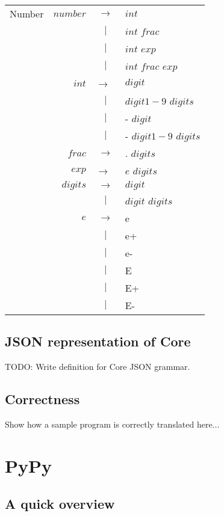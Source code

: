 \documentclass{article}
\begin{document}
\begin{small}
\begin{longtable}{ l r c l }
Number		&
$number$	& $ \rightarrow $ 	& $int$ 			\\
		&
		& $ | $			& $int$ $frac$			\\
		&
		& $ | $			& $int$ $exp$			\\
		&
		& $ | $			& $int$ $frac$ $exp$		\\
		&
$int$		& $ \rightarrow$ 	& $digit$			\\
		&
		& $ | $ 		& $digit1-9$ $digits$		\\
		&
		& $ | $ 		& - $digit$			\\
		&
		& $ | $ 		& - $digit1-9$ $digits$	\\
		&
$frac$ 		& $ \rightarrow $ 	& . $digits$ 		\\
		&
$exp$		& $ \rightarrow $ 	& $e$ $digits$ 			\\
		&
$digits$	& $ \rightarrow $ 	& $digit$			\\
		&
		& $ | $ 		& $digit$ $digits$		\\
		&
$e$		& $ \rightarrow $ 	& e				\\
		&
		& $ | $ 		& e+				\\
		&
		& $ | $ 		& e- 				\\
		&
		& $ | $ 		& E				\\
		&
		& $ | $ 		& E+				\\
		&
		& $ | $ 		& E-				\\


\end{longtable}

\end{small}

\subsection{JSON representation of Core}

TODO: Write definition for Core JSON grammar.

\subsection{Correctness}

Show how a sample program is correctly translated here...

\section{PyPy}

\subsection{A quick overview}
\end{document}
